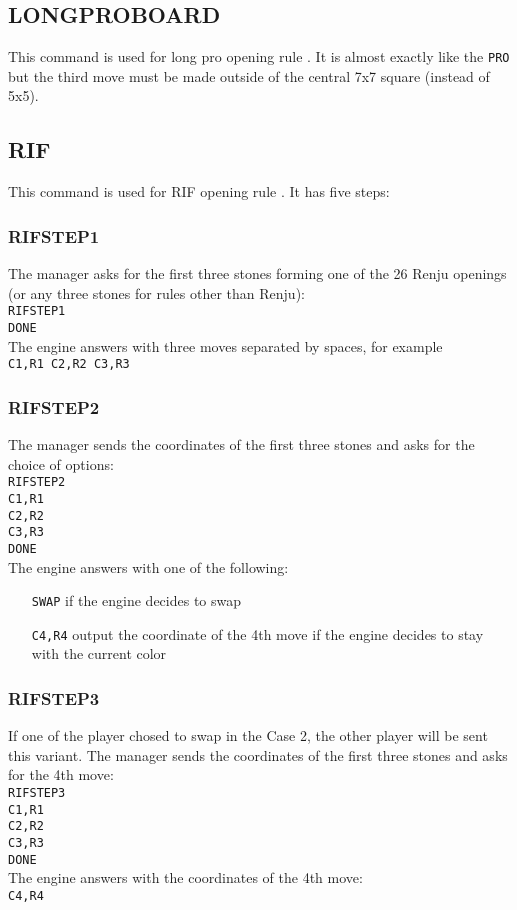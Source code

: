 \documentclass[12pt,a4paper]{article}
\begin{document}
\subsection{LONGPROBOARD}
\label{cmd_longpro}
This command is used for long pro opening rule \cite{gomoku_opening_rules}. It is almost exactly like the \texttt{PRO} but the third move must be made outside of the central 7x7 square (instead of 5x5).


\subsection{RIF}
\label{cmd_rif}
This command is used for RIF opening rule \cite{renju_opening_rules}. It has five steps:

\subsubsection{RIFSTEP1}
The manager asks for the first three stones forming one of the 26 Renju openings (or any three stones for rules other than Renju):\\
\texttt{RIFSTEP1}\\
\texttt{DONE}\\
The engine answers with three moves separated by spaces, for example\\
\texttt{C1,R1 C2,R2 C3,R3}

\subsubsection{RIFSTEP2}
The manager sends the coordinates of the first three stones and asks for the choice of options:\\
\texttt{RIFSTEP2}\\
\texttt{C1,R1}\\
\texttt{C2,R2}\\
\texttt{C3,R3}\\
\texttt{DONE}\\
The engine answers with one of the following:
\begin{enumerate}[leftmargin=7.5em]
\item[\texttt{SWAP}]{if the engine decides to swap}
\item[\texttt{C4,R4}]{output the coordinate of the 4th move if the engine decides to stay with the current color}
\end{enumerate}

\subsubsection{RIFSTEP3}
If one of the player chosed to swap in the Case 2, the other player will be sent this variant. The manager sends the coordinates of the first three stones and asks for the 4th move:\\
\texttt{RIFSTEP3}\\
\texttt{C1,R1}\\
\texttt{C2,R2}\\
\texttt{C3,R3}\\
\texttt{DONE}\\
The engine answers with the coordinates of the 4th move:\\
\texttt{C4,R4}
\end{document}
